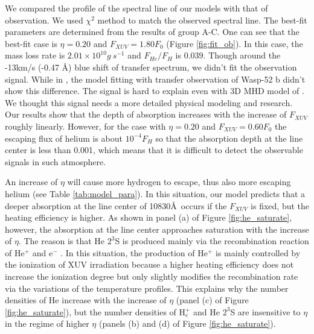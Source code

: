 \documentclass[journal, onecolumn]{aastex631}
\begin{document}
\begin{CJK*}{UTF8}{gbsn}
We compared the profile of the spectral line of our models with that of observation. We used $\chi^{2}$ method to match the observed spectral line. The best-fit parameters are determined from the results of group A-C. One can see that the best-fit case is  $\eta = 0.20$ and $F_{XUV} = 1.80 F_{0}$ (Figure \ref{fig:fit_ob}). In this case, the mass loss rate is $2.01\times 10^{10}g\ s^{-1}$ and $F_{He}/F_{H}$ is $0.039$. Though around the -13km/s (-0.47 \AA) blue shift of transfer spectrum, we didn't fit the observation signal. While in \cite{Yan2022}, the model fitting with transfer observation of Wasp-52 b didn't show this difference. The signal is hard to explain even with 3D MHD model of \cite{Khodachenko2021_0}. We thought this signal needs a more detailed physical modeling and research. Our results show that the depth of absorption increases with the increase of $F_{XUV}$ roughly linearly. However, for the case with $\eta = 0.20$ and $F_{XUV}=0.60F_{0}$ the escaping flux of helium is about $10^{-4} F_{H}$ so that the absorption depth at the line center is less than 0.001, which means that it is difficult to detect the observable signals in such atmosphere.

An increase of $\eta$ will cause more hydrogen to escape, thus also more escaping helium (see Table \ref{tab:model_para}). In this situation, our model predicts that a deeper absorption at the line center of 10830\AA \ occurs if the $F_{XUV}$ is fixed, but the heating efficiency is higher. As shown in panel (a) of Figure \ref{fig:he_saturate}, however, the absorption at the line center approaches saturation with the increase of $\eta$. The reason is that He $2^3$S is produced mainly via the recombination reaction of He$^+$ and e$^-$ \citep{Oklopcic2018}. In this situation, the production of He$^+$ is mainly controlled by the ionization of XUV irradiation because a higher heating efficiency does not increase the ionization degree but only slightly modifies the recombination rate via the variations of the temperature profiles. This explains why the number densities of He increase with the increase of $\eta$ (panel (c) of Figure \ref{fig:he_saturate}), but the number densities of H$_{e}^{+}$ and He $2^3$S are insensitive to $\eta$ in the regime of higher $\eta$ (panels (b) and (d) of Figure \ref{fig:he_saturate}).





\end{CJK*}
\end{document}
